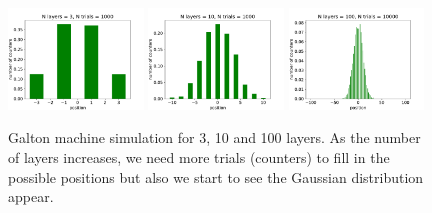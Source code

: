 \begin{figure}[hbt!]
    \centering
    \includegraphics[width=0.32\textwidth]{figures/Probability/layers3.pdf}
    \includegraphics[width=0.32\textwidth]{figures/Probability/layers10.pdf}
    \includegraphics[width=0.32\textwidth]{figures/Probability/layers100.pdf}
    \caption{Galton machine simulation for 3, 10 and 100 layers. As the number of layers increases, we need more trials (counters) to fill in the possible positions but also we start to see the Gaussian distribution appear.}
    \label{fig:simgalton}
\end{figure}